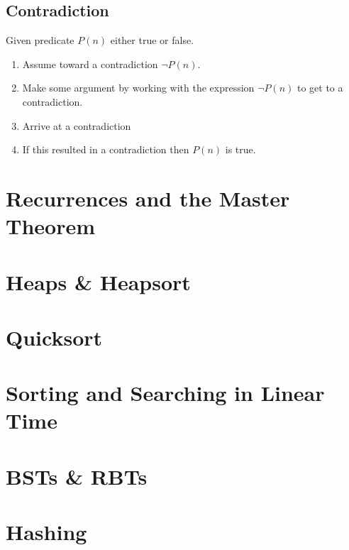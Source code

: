 \documentclass{article}
\begin{document}
\subsection{Contradiction}
\begin{process}
    Given predicate $P(n)$ either true or false.
    \begin{enumerate}
        \item Assume toward a contradiction $\neg P(n)$.
        \item Make some argument by working with the expression $\neg P(n)$ to get to a contradiction.
        \item Arrive at a contradiction
        \item If this resulted in a contradiction then $P(n)$ is true. 
    \end{enumerate}
\end{process}
\newpage

\section{Recurrences and the Master Theorem}
\newpage

\section{Heaps \& Heapsort}
\newpage

\section{Quicksort}
\newpage

\section{Sorting and Searching in Linear Time}
\newpage

\section{BSTs \& RBTs}
\newpage 

\section{Hashing}

\newpage
\end{document}

